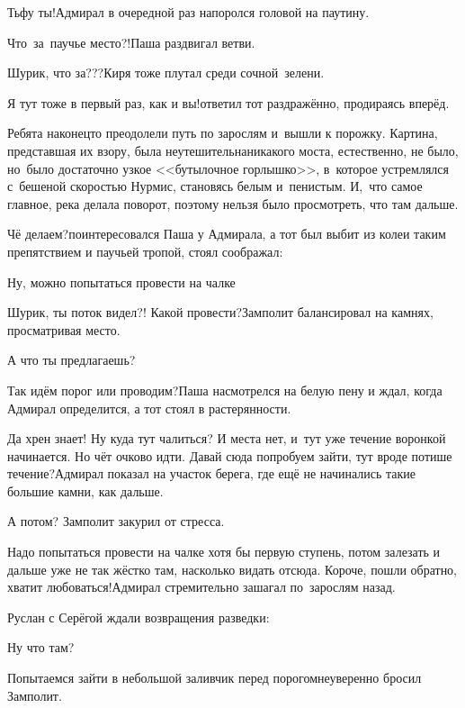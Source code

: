 \diagdash Тьфу ты!\mdash Адмирал в очередной раз напоролся головой на паутину.

\diagdash Что~за~паучье место?!\mdash Паша раздвигал ветви.

\diagdash Шурик, что за???\mdash Киря тоже плутал среди сочной~зелени.

\diagdash Я тут тоже в первый раз, как и вы!\mdash ответил тот раздражённо, продираясь вперёд. 

Ребята наконец\sdash то преодолели путь по зарослям и~вышли к порожку. Картина, представшая их взору, была неутешительна\mdash никакого моста, естественно, не было, но~было достаточно узкое <<бутылочное горлышко>>, в~которое устремлялся с~бешеной скоростью Нурмис, становясь белым и~пенистым. И,~что самое главное, река делала поворот, поэтому нельзя было просмотреть, что там дальше. 

\diagdash Чё делаем?\mdash поинтересовался Паша у Адмирала, а тот был выбит из колеи таким препятствием и паучьей тропой, стоял соображал:


\diagdash Ну, можно попытаться провести на чалке\myldots{}

\diagdash Шурик, ты поток видел?! Какой провести?\mdash Замполит балансировал на камнях, просматривая место.

\diagdash А что ты предлагаешь?

\diagdash Так идём порог или проводим?\mdash Паша насмотрелся на белую пену и ждал, когда Адмирал определится, а тот стоял в растерянности. 

\diagdash Да хрен знает! Ну куда тут чалиться? И места нет, и~тут уже течение воронкой начинается. Но чёт очково идти. Давай сюда попробуем зайти, тут вроде потише течение?\mdash Адмирал показал на участок берега, где ещё не начинались такие большие камни, как дальше. 

\diagdash А потом? \mdash Замполит закурил от стресса.

\diagdash Надо попытаться провести на чалке хотя бы первую ступень, потом залезать и дальше уже не так жёстко там, насколько видать отсюда. Короче, пошли обратно, хватит любоваться!\mdash Адмирал стремительно зашагал по~зарослям назад.

Руслан с Серёгой ждали возвращения разведки:

\diagdash Ну что там?

\diagdash Попытаемся зайти в небольшой заливчик перед порогом\myldots{}\mdash неуверенно бросил Замполит.

